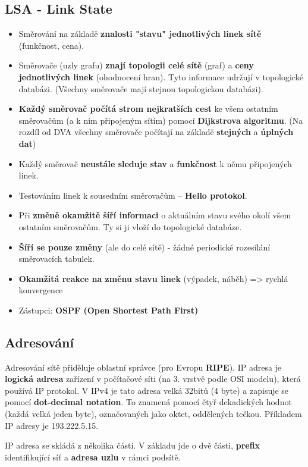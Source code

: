 \subsection{LSA - Link State}
\begin{itemize}
\item Směrování na základě \textbf{znalosti "stavu" jednotlivých linek sítě} (funkčnost, cena).
\item Směrovače (uzly grafu) \textbf{znají topologii celé sítě }(graf) a \textbf{ceny jednotlivých linek} (ohodnocení hran). Tyto informace udržují v topologické databázi. (Všechny směrovače mají stejnou topologickou databázi).
\item \textbf{Každý směrovač počítá strom nejkratších cest} ke všem ostatním směrovačům (a k nim připojeným sítím) pomocí \textbf{Dijkstrova algoritmu}. (Na rozdíl od DVA všechny směrovače počítají na základě \textbf{stejných} a\textbf{ úplných dat})
\item Každý směrovač\textbf{ neustále sleduje stav} a \textbf{funkčnost} k němu připojených linek.
\item Testováním linek k sousedním směrovačům – \textbf{Hello protokol}.
\item Při \textbf{změně okamžitě šíří informaci} o aktuálním stavu svého okolí všem ostatním směrovačům. Ty si ji vloží do topologické databáze.
\item \textbf{Šíří se pouze změny} (ale do celé sítě) - žádné periodické rozesílání směrovacích tabulek.
\item \textbf{Okamžitá reakce na změnu stavu linek} (výpadek, náběh) => rychlá konvergence
\item Zástupci: \textbf{OSPF (Open Shortest Path First)}
\end{itemize}

\subsection{Adresování} 
Adresování sítě přiděluje oblastní správce (pro Evropu \textbf{RIPE}). IP adresa je \textbf{logická adresa} zařízení v počítačové síti (na 3. vrstvě podle OSI modelu), která používá IP protokol. V IPv4 je tato adresa velká 32bitů (4 byte) a zapisuje se pomocí \textbf{dot-decimal notation}. To znamená pomocí čtyř dekadických hodnot (každá velká jeden byte), označovaných jako oktet, oddělených tečkou. Příkladem IP adresy je 193.222.5.15. 

IP adresa se skládá z několika částí. V základu jde o dvě části, \textbf{prefix} identifikující síť a \textbf{adresa uzlu} v rámci podsítě.

